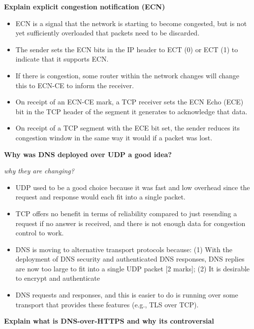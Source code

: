 \documentclass{article}
\begin{document}
\textbf{Explain explicit congestion notification (ECN)}
\begin{itemize}
    \item ECN is a signal that the network is starting to become congested, but is not
    yet sufficiently overloaded that packets need to be discarded.
    \item The sender sets the ECN bits in the IP header to ECT (0) or ECT (1) to indicate that it
    supports ECN\@.
    \item If there is congestion, some router within the network changes
    will change this to ECN-CE to inform the receiver.
    \item On receipt of an ECN-CE mark, a TCP receiver sets the ECN Echo (ECE) bit in the
    TCP header of the segment it generates to acknowledge that data.
    \item On receipt of a TCP segment with the ECE bit set, the sender reduces its congestion
    window in the same way it would if a packet was lost.
\end{itemize}

\textbf{Why was DNS deployed over UDP a good idea?}

\textit{why they are changing?}
\begin{itemize}
    \item UDP used to be a good choice because it was fast and low overhead since the
    request and response would each fit into a single packet.
    \item TCP offers no benefit in terms of reliability compared to just resending a request if no answer is received, and there is not enough data for congestion control to work.
    \item DNS is moving to alternative transport protocols because: (1) With the deployment
    of DNS security and authenticated DNS responses, DNS replies are now too large to
    fit into a single UDP packet [2 marks]; (2) It is desirable to encrypt and authenticate
    \item DNS requests and responses, and this is easier to do is running over some transport that
    provides these features (e.g., TLS over TCP).
\end{itemize}

\textbf{Explain what is DNS-over-HTTPS and why its controversial}
\end{document}
